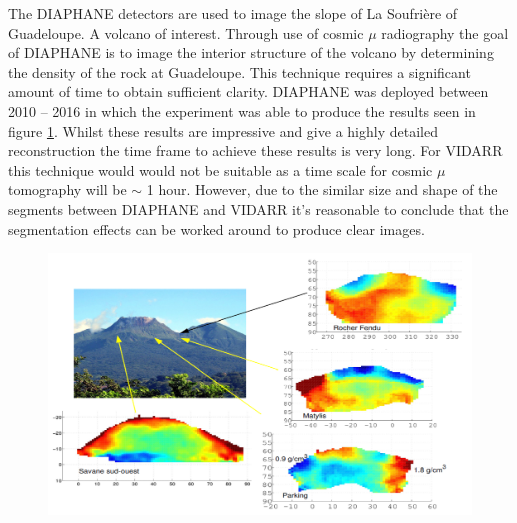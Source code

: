 The DIAPHANE detectors are used to image the slope of La Soufrière of Guadeloupe. A volcano of interest. Through use of cosmic $\mu$ radiography the goal of DIAPHANE is to image the interior structure of the volcano by determining the density of the rock at Guadeloupe. This technique requires a significant amount of time to obtain sufficient clarity. DIAPHANE was deployed between 2010 -- 2016 in which the experiment was able to produce the results seen in figure \ref{fig:diaphaneStructualImaging}. Whilst these results are impressive and give a highly detailed reconstruction the time frame to achieve these results is very long. For VIDARR this technique would would not be suitable as a time scale for cosmic $\mu$ tomography will be $\sim$ 1 hour. However, due to the similar size and shape of the segments between DIAPHANE and VIDARR it's reasonable to conclude that the segmentation effects can be worked around to produce clear images. 

\begin{figure}[!h]
 \centering
 \includegraphics[width=1.0\linewidth]{Chapter5/Figs/Raster/diaphane_structuralImaging.png}
 \label{fig:diaphaneStructualImaging}
\end{figure}


